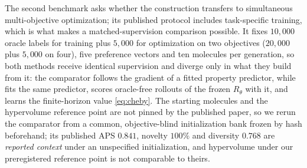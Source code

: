 The second benchmark asks whether the construction transfers to simultaneous multi-objective optimization; its published protocol includes task-specific training, which is what makes a matched-supervision comparison possible.
It fixes $10{,}000$ oracle labels for training plus $5{,}000$ for optimization on two objectives ($20{,}000$ plus $5{,}000$ on four), five preference vectors and ten molecules per generation, so both methods receive identical supervision and diverge only in what they build from it: the comparator follows the gradient of a fitted property predictor, while \method{} fits the same predictor, scores oracle-free rollouts of the frozen $R_\theta$ with it, and learns the finite-horizon value \eqref{eq:cheby}.
The starting molecules and the hypervolume reference point are not pinned by the published paper, so we rerun the comparator from a common, objective-blind initialization bank frozen by hash beforehand; its published APS $0.841$, novelty $100\%$ and diversity $0.768$ are \emph{reported context} under an unspecified initialization, and hypervolume under our preregistered reference point is not comparable to theirs.

